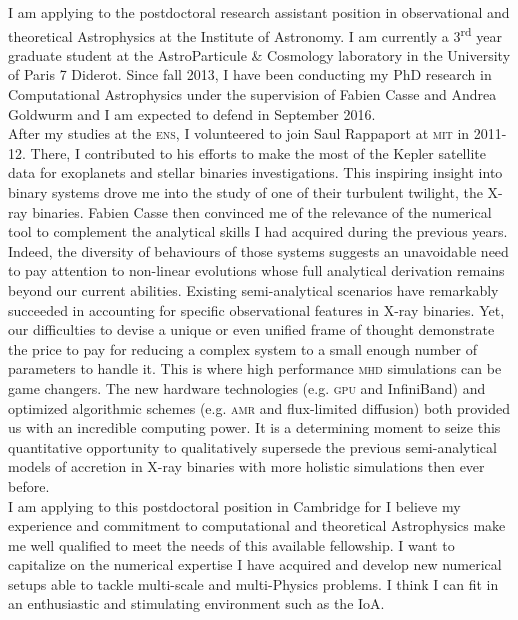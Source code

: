 \documentclass[12pt]{letter}
\begin{document}
\begin{letter} {}
\hspace*{0.5cm} I am applying to the postdoctoral research assistant position in observational and theoretical Astrophysics at the Institute of Astronomy. I am currently a 3\textsuperscript{rd} year graduate student at the AstroParticule \& Cosmology laboratory in the University of Paris 7 Diderot. Since fall 2013, I have been conducting my PhD research in Computational Astrophysics under the supervision of Fabien Casse and Andrea Goldwurm and I am expected to defend in September 2016.\\
\hspace*{0.5cm} After my studies at the \textsc{ens}, I volunteered to join Saul Rappaport at \textsc{mit} in 2011-12. There, I contributed to his efforts to make the most of the Kepler satellite data for exoplanets and stellar binaries investigations. This inspiring insight into binary systems drove me into the study of one of their turbulent twilight, the X-ray binaries. Fabien Casse then convinced me of the relevance of the numerical tool to complement the analytical skills I had acquired during the previous years. Indeed, the diversity of behaviours of those systems suggests an unavoidable need to pay attention to non-linear evolutions whose full analytical derivation remains beyond our current abilities. Existing semi-analytical scenarios have remarkably succeeded in accounting for specific observational features in X-ray binaries. Yet, our difficulties to devise a unique or even unified frame of thought demonstrate the price to pay for reducing a complex system to a small enough number of parameters to handle it. This is where high performance \textsc{mhd} simulations can be game changers. The new hardware technologies (e.g. \textsc{gpu} and InfiniBand) and optimized algorithmic schemes (e.g. \textsc{amr} and flux-limited diffusion) both provided us with an incredible computing power. It is a determining moment to seize this quantitative opportunity to qualitatively supersede the previous semi-analytical models of accretion in X-ray binaries with more holistic simulations then ever before.\\
\hspace*{0.5cm} I am applying to this postdoctoral position in Cambridge for I believe my experience and commitment to computational and theoretical Astrophysics make me well qualified to meet the needs of this available fellowship. I want to capitalize on the numerical expertise I have acquired and develop new numerical setups able to tackle multi-scale and multi-Physics problems. I think I can fit in an enthusiastic and stimulating environment such as the IoA.\\

\end{letter}
\end{document}
